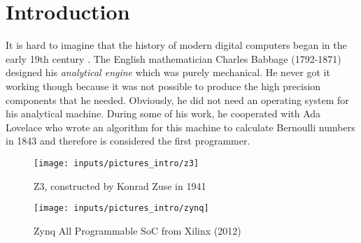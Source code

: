 \chapter{Introduction}
It is hard to imagine that the history of modern digital computers began in the early 19th century \cite{tanenbaum:mos}.
The English mathematician Charles Babbage (1792-1871) designed his \textit{analytical engine} which was purely mechanical. 
He never got it working though because it was not possible to produce the high precision components that he needed.  Obviously, he did not need an operating system for his analytical machine.
During some of his work, he cooperated with Ada Lovelace who wrote an algorithm for this machine to calculate Bernoulli numbers in 1843 \cite{toole:ateon} and therefore is considered the first programmer.

\begin{figure}[htb]
	\begin{minipage}[ht]{7.5cm}
		\begin{center}
		\texttt{[image: inputs/pictures\_intro/z3]}
		\caption[Z3, constructed by Konrad Zuse in 1941]{Z3, constructed by Konrad Zuse in 1941 \cite{uh:kz}} 		\label{fig_z3}
		\end{center}
	\end{minipage}
	\hspace{0.5cm}
	\begin{minipage}[ht]{7.5cm}
		\begin{center}
		\texttt{[image: inputs/pictures\_intro/zynq]}
		\caption[Zynq All Programmable SoC from Xilinx (2012)]{Zynq All Programmable SoC from Xilinx (2012) \cite{maxfield:xtzapstg}} \label{fig_zynq}
		\end{center}
	\end{minipage}
\end{figure}  


